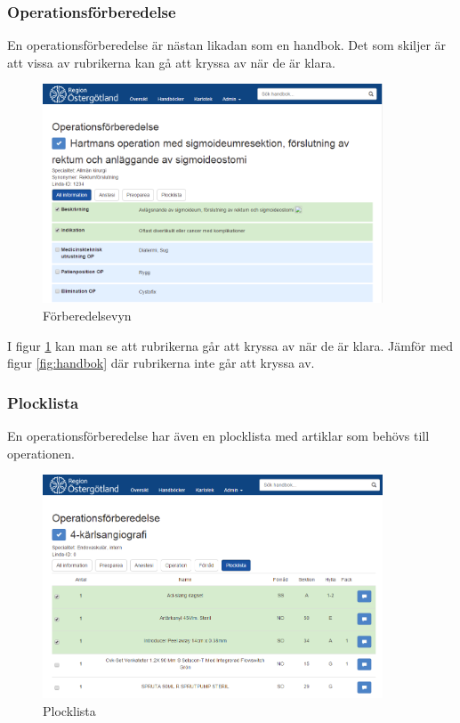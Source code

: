 \subsubsection{Operationsförberedelse}
En operationsförberedelse är nästan likadan som en handbok.
Det som skiljer är att vissa av rubrikerna kan gå att kryssa av när de är klara.

\begin{figure}
  \centering
  \includegraphics[width=0.9\textwidth]{images/site/op}
  \caption{Förberedelsevyn}
  \label{fig:op}
\end{figure}

I figur \ref{fig:op} kan man se att rubrikerna går att kryssa av när de är klara. Jämför med figur \ref{fig:handbok} där rubrikerna inte går att kryssa av.

\subsubsection{Plocklista}
En operationsförberedelse har även en plocklista med artiklar som behövs till operationen.

\begin{figure}
  \centering
  \includegraphics[width=0.9\textwidth]{images/site/plocklista}
  \caption{Plocklista}
  \label{fig:plocklista}
\end{figure}

